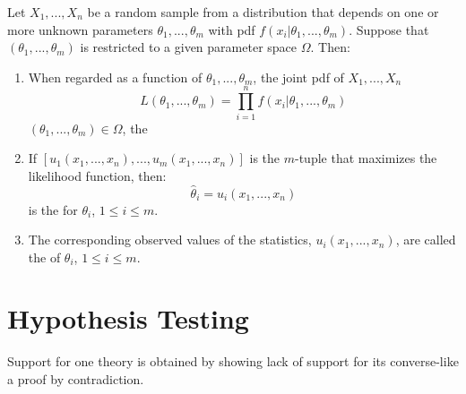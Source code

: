 \documentclass[12pt, a4paper, twoside, openright, titlepage]{book}
\begin{document}
\begin{defn}{}{}
    Let $X_1,...,X_n$ be a random sample from a distribution that depends on one or more unknown parameters $\theta_1,...,\theta_m$ with pdf $f(x_i\vert\theta_1,...,\theta_m)$. Suppose that $(\theta_1,...,\theta_m)$ is restricted to a given parameter space $\Omega$. Then: \begin{enumerate}
        \item When regarded as a function of $\theta_1,...,\theta_m$, the joint pdf of $X_1,...,X_n$ \begin{equation*}
                L(\theta_1,...,\theta_m) = \prod_{i=1}^nf(x_i\vert\theta_1,...,\theta_m)
        \end{equation*}
            $(\theta_1,...,\theta_m) \in \Omega$, the 
        \item If $[u_1(x_1,...,x_n),...,u_m(x_1,...,x_n)]$ is the $m$-tuple that maximizes the likelihood function, then: \begin{equation*}
                \hat{\theta}_i = u_i(x_1,...,x_n)
        \end{equation*}
            is the  for $\theta_i$, $1 \leq i \leq m$.
        \item The corresponding observed values of the statistics, $u_i(x_1,...,x_n)$, are called the  of $\theta_i$, $1 \leq i \leq m$.
    \end{enumerate}
\end{defn}


\chapter{Hypothesis Testing}


Support for one theory is obtained by showing lack of support for its converse-like a proof by contradiction.
\end{document}
